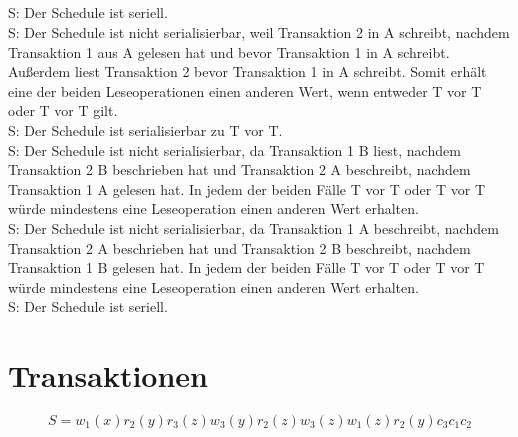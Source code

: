 \documentclass[ngerman]{gdb-aufgabenblatt}
\begin{document}
	\subsection{} %
		S: Der Schedule ist seriell. \\
		S: Der Schedule ist nicht serialisierbar, weil Transaktion 2 in A schreibt, nachdem Transaktion 1 aus A gelesen hat und bevor Transaktion 1 in A schreibt. Außerdem liest Transaktion 2 bevor Transaktion 1 in A schreibt. Somit erhält eine der beiden Leseoperationen einen anderen Wert, wenn entweder T vor T oder T vor T gilt. \\
		S: Der Schedule ist serialisierbar zu T vor T.\\
		S: Der Schedule ist nicht serialisierbar, da Transaktion 1 B liest, nachdem Transaktion 2 B beschrieben hat und Transaktion 2 A beschreibt, nachdem Transaktion 1 A gelesen hat. In jedem der beiden Fälle T vor T oder T vor T würde mindestens eine Leseoperation einen anderen Wert erhalten. \\
		S: Der Schedule ist nicht serialisierbar, da Transaktion 1 A beschreibt, nachdem Transaktion 2 A beschrieben hat und Transaktion 2 B beschreibt, nachdem Transaktion 1 B gelesen hat. In jedem der beiden Fälle T vor T oder T vor T würde mindestens eine Leseoperation einen anderen Wert erhalten.\\
		S: Der Schedule ist seriell.
\section{Transaktionen}
	\[S = w_{1}(x)r_{2}(y)r_{3}(z)w_{3}(y)r_{2}(z)w_{3}(z)w_{1}(z)r_{2}(y)c_{3}c_{1}c_{2}\]	
	
\end{document}

